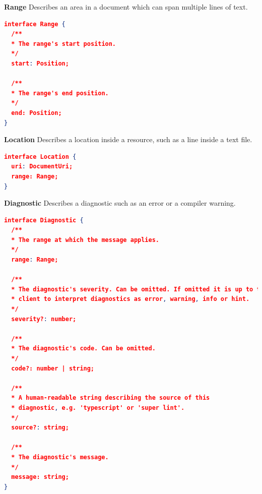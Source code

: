 \textbf{Range}
Describes an area in a document which can span multiple lines of text.
\begin{lstlisting}[language=json,firstnumber=1]
interface Range {
  /**
  * The range's start position.
  */
  start: Position;

  /**
  * The range's end position.
  */
  end: Position;
}
\end{lstlisting}

\textbf{Location}
Describes a location inside a resource, such as a line inside a text file.
\begin{lstlisting}[language=json,firstnumber=1]
interface Location {
  uri: DocumentUri;
  range: Range;
}
\end{lstlisting}

\textbf{Diagnostic}
Describes a diagnostic such as an error or a compiler warning.
\begin{lstlisting}[language=json,firstnumber=1]
interface Diagnostic {
  /**
  * The range at which the message applies.
  */
  range: Range;

  /**
  * The diagnostic's severity. Can be omitted. If omitted it is up to the
  * client to interpret diagnostics as error, warning, info or hint.
  */
  severity?: number;

  /**
  * The diagnostic's code. Can be omitted.
  */
  code?: number | string;

  /**
  * A human-readable string describing the source of this
  * diagnostic, e.g. 'typescript' or 'super lint'.
  */
  source?: string;

  /**
  * The diagnostic's message.
  */
  message: string;
}
\end{lstlisting}

